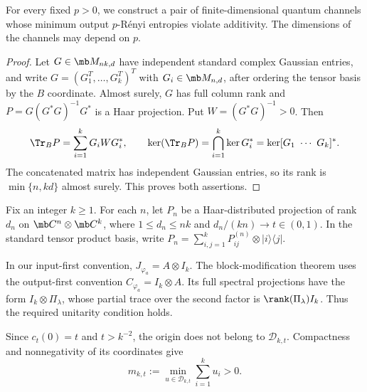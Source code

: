 
For every fixed $p>0$, we construct a pair of finite-dimensional
quantum channels whose minimum output $p$-R\'enyi entropies violate
additivity. The dimensions of the channels may depend on $p$.

\begin{proof}
Let $G\in\mb M_{nk,d}$ have independent standard complex Gaussian entries,
and write $G=(G_1^T,\ldots,G_k^T)^T$ with $G_i\in\mb M_{n,d}$,
after ordering the tensor basis by the $B$ coordinate.
Almost surely, $G$ has full column rank and
$P=G(G^*G)^{-1}G^*$ is a Haar projection. Put $W=(G^*G)^{-1}>0$.
Then
\begin{equation}
 \Tr_BP=\sum_{i=1}^kG_iWG_i^*,\qquad
 \ker(\Tr_BP)=\bigcap_{i=1}^k\ker G_i^*
             =\ker [G_1\ \cdots\ G_k]^*.
\end{equation}
The concatenated matrix has independent Gaussian entries, so its rank
is $\min\{n,kd\}$ almost surely. This proves both assertions.
\end{proof}

Fix an integer $k\geq1$. For each $n$, let $P_n$ be a Haar-distributed
projection of rank $d_n$ on $\mb C^n\otimes\mb C^k$, where
$1\leq d_n\leq nk$ and $d_n/(kn)\to t\in(0,1)$.
In the standard tensor product basis, write
$P_n=\sum_{i,j=1}^kP_{ij}^{(n)}\otimes|i\rangle\langle j|$.

In our input-first convention, $J_{\varphi_a}=A\otimes I_k$.
The block-modification theorem uses the output-first convention
$C_{\varphi_a}=I_k\otimes A$. Its full spectral projections have the
form $I_k\otimes\Pi_\lambda$, whose partial trace over the second
factor is $\rank(\Pi_\lambda)I_k$. Thus the required unitarity
condition holds.


Since $c_t(0)=t$ and $t>k^{-2}$, the origin does not belong to
$\mathscr D_{k,t}$. Compactness and nonnegativity of its coordinates give
\begin{equation}
 m_{k,t}:=\min_{u\in\mathscr D_{k,t}}\sum_{i=1}^ku_i>0.
 \label{eq:positive-local-mass}
\end{equation}

